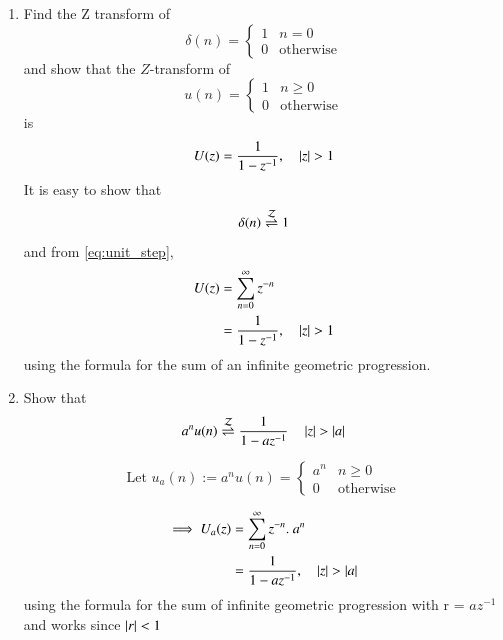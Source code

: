 \documentclass[journal,12pt,twocolumn]{IEEEtran}
\renewcommand\thesection{\arabic{section}}
\begin{document}
\begin{enumerate}[label=\thesection.\arabic*]
%
\item Find the Z transform of 
\begin{equation}
\delta(n)
=
\begin{cases}
1 & n = 0
\\
0 & \text{otherwise}
\end{cases}
\end{equation}
and show that the $Z$-transform of
\begin{equation}
\label{eq:unit_step}
u(n)
=
\begin{cases}
1 & n \ge 0
\\
0 & \text{otherwise}
\end{cases}
\end{equation}
is
\begin{equation}
U(z) = \frac{1}{1-z^{-1}}, \quad \left \vert z\right\vert > 1
\end{equation}
\solution It is easy to show that
\begin{equation}
\delta(n) \overset{\mathcal{Z}}{ \rightleftharpoons} 1
\end{equation}
and from \eqref{eq:unit_step},
\begin{align}
\label{eq:4.14}
U(z) &= \sum _{n= 0}^{\infty}z^{-n}
\\
&=\frac{1}{1-z^{-1}}, \quad \left \vert z\right\vert > 1
\end{align}
using the formula for the sum of an infinite geometric progression.
%
\item Show that 
\begin{equation}
\label{eq:anun}
a^nu(n) \overset{\mathcal{Z}}{ \rightleftharpoons} \frac{1}{1-az^{-1}} \quad \left \vert z\right\vert > \left \vert a\right\vert
\end{equation}
%

\solution 
\begin{equation}
\text{Let } u_a(n) := a^nu(n) =
\begin{cases}
a^n & n \ge 0
\\
0 & \text{otherwise}
\end{cases}
\end{equation}

\begin{align}
\implies U_a(z) & = \sum _{n= 0}^{\infty}z^{-n} . \ a^n
\\
&=\frac{1}{1-az^{-1}}, \quad \left \vert z\right\vert > \left \vert a\right\vert
\end{align}
using the formula for the sum of infinite geometric progression with r = $az^{-1}$ and works since $\left \vert r\right\vert < 1$
%


\end{enumerate}
\end{document}
